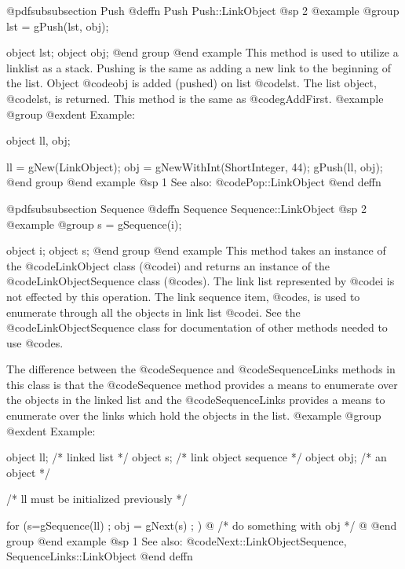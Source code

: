 @pdfsubsubsection {Push}
@deffn {Push} Push::LinkObject
@sp 2
@example
@group
lst = gPush(lst, obj);

object  lst;
object  obj;
@end group
@end example
This method is used to utilize a linklist as a stack.  Pushing is the
same as adding a new link to the beginning of the list.  Object
@code{obj} is added (pushed) on list @code{lst}.  The list object,
@code{lst}, is returned.  This method is the same as @code{gAddFirst}.
@example
@group
@exdent Example:

object  ll, obj;

ll = gNew(LinkObject);
obj = gNewWithInt(ShortInteger, 44);
gPush(ll, obj);
@end group
@end example
@sp 1
See also:  @code{Pop::LinkObject}
@end deffn









@pdfsubsubsection {Sequence}
@deffn {Sequence} Sequence::LinkObject
@sp 2
@example
@group
s = gSequence(i);

object  i;
object  s;
@end group
@end example
This method takes an instance of the @code{LinkObject} class (@code{i})
and returns an instance of the @code{LinkObjectSequence} class
(@code{s}).  The link list represented by @code{i} is not effected by
this operation.  The link sequence item, @code{s}, is used to enumerate
through all the objects in link list @code{i}.  See the
@code{LinkObjectSequence} class for documentation of other methods
needed to use @code{s}.

The difference between the @code{Sequence} and @code{SequenceLinks}
methods in this class is that the @code{Sequence} method provides a
means to enumerate over the objects in the linked list and the
@code{SequenceLinks} provides a means to enumerate over the links
which hold the objects in the list.
@example
@group
@exdent Example:

object  ll;  /*  linked list           */
object  s;   /*  link object sequence  */
object  obj; /*  an object             */

/*  ll must be initialized previously  */

for (s=gSequence(ll) ; obj = gNext(s) ; )  @{
        /*  do something with obj  */
@}
@end group
@end example
@sp 1
See also:  @code{Next::LinkObjectSequence, SequenceLinks::LinkObject}
@end deffn














